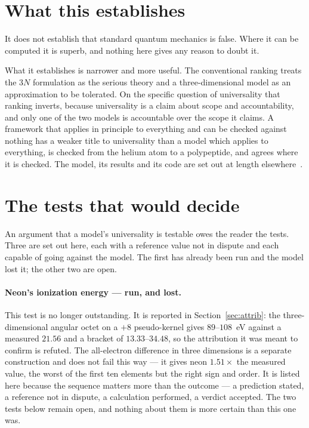 \documentclass[11pt]{article}
\begin{document}
\section{What this establishes}

It does not establish that standard quantum mechanics is false. Where it can be computed it is
superb, and nothing here gives any reason to doubt it.

What it establishes is narrower and more useful. The conventional ranking treats the $3N$
formulation as the serious theory and a three-dimensional model as an approximation to be
tolerated. On the specific question of universality that ranking inverts, because universality is
a claim about scope and accountability, and only one of the two models is accountable over the
scope it claims. A framework that applies in principle to everything and can be checked against
nothing has a weaker title to universality than a model which applies to everything, is checked
from the helium atom to a polypeptide, and agrees where it is checked. The model, its results and
its code are set
out at length elsewhere~\cite{Johnson-RealQM,Johnson-atoms,Johnson-BookVI}.


\section{The tests that would decide}\label{sec:tests}

An argument that a model's universality is testable owes the reader the tests. Three are set out
here, each with a reference value not in dispute and each capable of going against the model. The
first has already been run and the model lost it; the other two are open.

\paragraph{Neon's ionization energy --- run, and lost.} This test is no longer outstanding. It is
reported in Section~\ref{sec:attrib}: the three-dimensional angular octet on a $+8$ pseudo-kernel
gives $89$--$108$~eV against a measured $21.56$ and a bracket of $13.33$--$34.48$, so the
attribution it was meant to confirm is refuted. The all-electron difference in three dimensions is a
separate construction and does not fail this way --- it gives neon $1.51\times$ the measured value,
the worst of the first ten elements but the right sign and order. It is listed here because the sequence matters more than the outcome --- a
prediction stated, a reference not in dispute, a calculation performed, a verdict accepted. The two
tests below remain open, and nothing about them is more certain than this one was.
\end{document}
